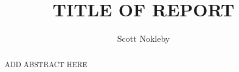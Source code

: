 \documentclass[12pt, titlepage]{MARSarticle}
\title{TITLE OF REPORT}
\author{Scott Nokleby}
\date{}		%
\begin{document}
\maketitle    

    \begin{abstract}
ADD ABSTRACT HERE
    \end{abstract}


    \clearpage








\end{document}
